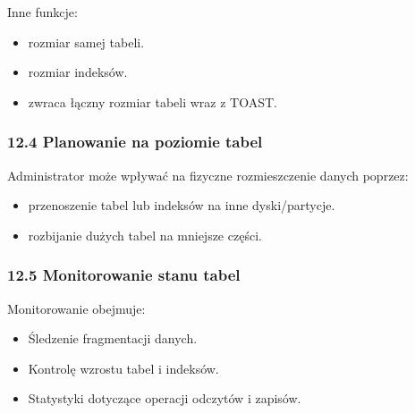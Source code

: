 \documentclass[letterpaper,10pt,polish]{sphinxmanual}
\begin{document}
\sphinxAtStartPar
Inne funkcje:
\begin{itemize}
\item {} 
\sphinxAtStartPar
{} \textendash{} rozmiar samej tabeli.

\item {} 
\sphinxAtStartPar
{} \textendash{} rozmiar indeksów.

\item {} 
\sphinxAtStartPar
{} \textendash{} zwraca łączny rozmiar tabeli wraz z TOAST.

\end{itemize}


\subsubsection{12.4 Planowanie na poziomie tabel}
\label{\detokenize{rozdzial2/Konfiguracja_baz_danych/Konfiguracja_baz_danych:planowanie-na-poziomie-tabel}}
\sphinxAtStartPar
Administrator może wpływać na fizyczne rozmieszczenie danych poprzez:
\begin{itemize}
\item {} 
\sphinxAtStartPar
{} \textendash{} przenoszenie tabel lub indeksów na inne dyski/partycje.

\item {} 
\sphinxAtStartPar
{} \textendash{} rozbijanie dużych tabel na mniejsze części.

\end{itemize}


\subsubsection{12.5 Monitorowanie stanu tabel}
\label{\detokenize{rozdzial2/Konfiguracja_baz_danych/Konfiguracja_baz_danych:monitorowanie-stanu-tabel}}
\sphinxAtStartPar
Monitorowanie obejmuje:
\begin{itemize}
\item {} 
\sphinxAtStartPar
Śledzenie fragmentacji danych.

\item {} 
\sphinxAtStartPar
Kontrolę wzrostu tabel i indeksów.

\item {} 
\sphinxAtStartPar
Statystyki dotyczące operacji odczytów i zapisów.

\end{itemize}
\end{document}
